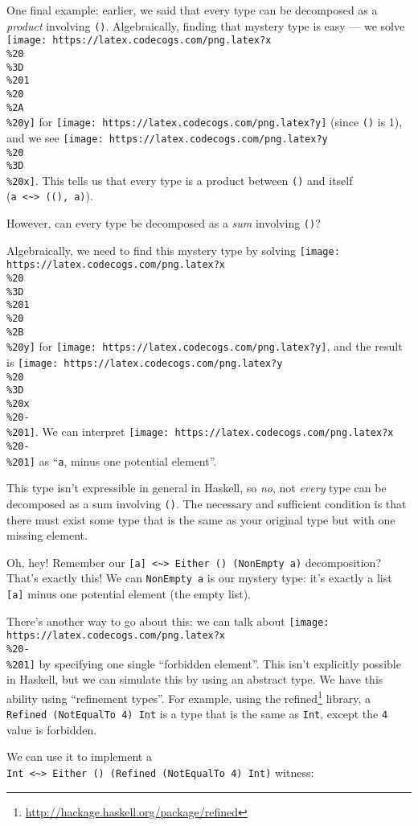 \documentclass[]{article}
\renewcommand{\href}[2]{#2\footnote{\url{#1}}}
\begin{document}
One final example: earlier, we said that every type can be decomposed as a
\emph{product} involving \texttt{()}. Algebraically, finding that mystery type
is easy --- we solve
\texttt{[image: https://latex.codecogs.com/png.latex?x\\\%20\\\%3D\\\%201\\\%20\\\%2A\\\%20y]}
for \texttt{[image: https://latex.codecogs.com/png.latex?y]} (since \texttt{()}
is 1), and we see
\texttt{[image: https://latex.codecogs.com/png.latex?y\\\%20\\\%3D\\\%20x]}. This
tells us that every type is a product between \texttt{()} and itself
(\texttt{a\ \textless{}\textasciitilde{}\textgreater{}\ ((),\ a)}).

However, can every type be decomposed as a \emph{sum} involving \texttt{()}?

Algebraically, we need to find this mystery type by solving
\texttt{[image: https://latex.codecogs.com/png.latex?x\\\%20\\\%3D\\\%201\\\%20\\\%2B\\\%20y]}
for \texttt{[image: https://latex.codecogs.com/png.latex?y]}, and the result is
\texttt{[image: https://latex.codecogs.com/png.latex?y\\\%20\\\%3D\\\%20x\\\%20-\\\%201]}.
We can interpret
\texttt{[image: https://latex.codecogs.com/png.latex?x\\\%20-\\\%201]} as
``\texttt{a}, minus one potential element''.

This type isn't expressible in general in Haskell, so \emph{no}, not
\emph{every} type can be decomposed as a sum involving \texttt{()}. The
necessary and sufficient condition is that there must exist some type that is
the same as your original type but with one missing element.

Oh, hey! Remember our
\texttt{{[}a{]}\ \textless{}\textasciitilde{}\textgreater{}\ Either\ ()\ (NonEmpty\ a)}
decomposition? That's exactly this! We can \texttt{NonEmpty\ a} is our mystery
type: it's exactly a list \texttt{{[}a{]}} minus one potential element (the
empty list).

There's another way to go about this: we can talk about
\texttt{[image: https://latex.codecogs.com/png.latex?x\\\%20-\\\%201]} by specifying
one single ``forbidden element''. This isn't explicitly possible in Haskell, but
we can simulate this by using an abstract type. We have this ability using
``refinement types''. For example, using the
\href{http://hackage.haskell.org/package/refined}{refined} library, a
\texttt{Refined\ (NotEqualTo\ 4)\ Int} is a type that is the same as
\texttt{Int}, except the \texttt{4} value is forbidden.

We can use it to implement a
\texttt{Int\ \textless{}\textasciitilde{}\textgreater{}\ Either\ ()\ (Refined\ (NotEqualTo\ 4)\ Int)}
witness:
\end{document}
